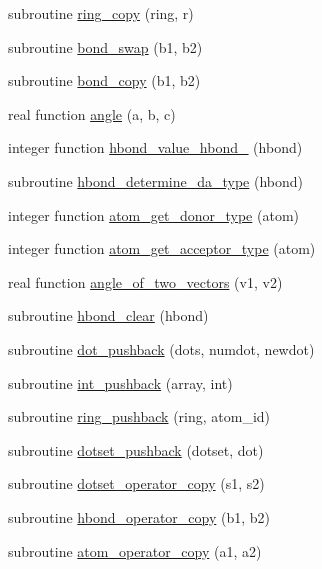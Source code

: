 \begin{DoxyCompactItemize}
subroutine \hyperlink{classcalc__xscore_ac51bc4c8c1999f720168c6300e83a4d6}{ring\-\_\-copy} (ring, r)
\item 
subroutine \hyperlink{classcalc__xscore_a6ada762138a0153522c7c8528dc13622}{bond\-\_\-swap} (b1, b2)
\item 
subroutine \hyperlink{classcalc__xscore_ada91caa56954105f587533e995d36928}{bond\-\_\-copy} (b1, b2)
\item 
real function \hyperlink{classcalc__xscore_ac26058be10982e727ea00760cf875b1a}{angle} (a, b, c)
\item 
integer function \hyperlink{classcalc__xscore_a0aa62d861bc4489fd6081e0680c156bb}{hbond\-\_\-value\-\_\-hbond\-\_} (hbond)
\item 
subroutine \hyperlink{classcalc__xscore_a33b3bcfd977e5d66722bbfa063081162}{hbond\-\_\-determine\-\_\-da\-\_\-type} (hbond)
\item 
integer function \hyperlink{classcalc__xscore_a0b94ce79878b2a744552e7b49e404318}{atom\-\_\-get\-\_\-donor\-\_\-type} (atom)
\item 
integer function \hyperlink{classcalc__xscore_ae4cd9edeba662e37372e473f30c51f84}{atom\-\_\-get\-\_\-acceptor\-\_\-type} (atom)
\item 
real function \hyperlink{classcalc__xscore_a6387f872b04fb852070672f3ed284fd1}{angle\-\_\-of\-\_\-two\-\_\-vectors} (v1, v2)
\item 
subroutine \hyperlink{classcalc__xscore_a3f6d53eca56b6cf55437a4430d3fa25f}{hbond\-\_\-clear} (hbond)
\item 
subroutine \hyperlink{classcalc__xscore_a091a7117aab99817ab1a08fe331228b2}{dot\-\_\-pushback} (dots, numdot, newdot)
\item 
subroutine \hyperlink{classcalc__xscore_ac40a4891b00c754eadbf3b4412ac3062}{int\-\_\-pushback} (array, int)
\item 
subroutine \hyperlink{classcalc__xscore_abbccb946aa88a24dfb6588af4d608537}{ring\-\_\-pushback} (ring, atom\-\_\-id)
\item 
subroutine \hyperlink{classcalc__xscore_aca410ef49cd2083ee6b275554e14603a}{dotset\-\_\-pushback} (dotset, dot)
\item 
subroutine \hyperlink{classcalc__xscore_ac3a6fbebe87d029f8f2dfdf7b0a891c0}{dotset\-\_\-operator\-\_\-copy} (s1, s2)
\item 
subroutine \hyperlink{classcalc__xscore_a023c3ce3e347ae0ab1c7474e9dd42baa}{hbond\-\_\-operator\-\_\-copy} (b1, b2)
\item 
subroutine \hyperlink{classcalc__xscore_a9dd11ed74f3ca590352e15c4e0681b37}{atom\-\_\-operator\-\_\-copy} (a1, a2)

\end{DoxyCompactItemize}
